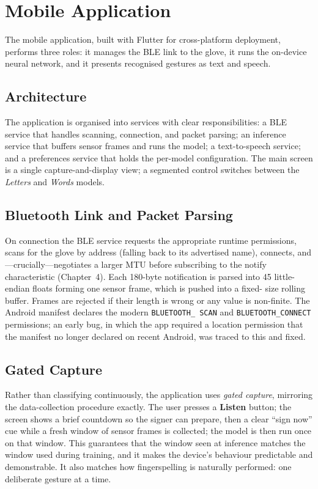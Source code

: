 \chapter{Mobile Application}

The mobile application, built with Flutter for cross-platform deployment,
performs three roles: it manages the BLE link to the glove, it runs the
on-device neural network, and it presents recognised gestures as text and
speech.

\section{Architecture}

The application is organised into services with clear responsibilities: a BLE
service that handles scanning, connection, and packet parsing; an inference
service that buffers sensor frames and runs the model; a text-to-speech
service; and a preferences service that holds the per-model configuration. The
main screen is a single capture-and-display view; a segmented control switches
between the \emph{Letters} and \emph{Words} models.

\section{Bluetooth Link and Packet Parsing}

On connection the BLE service requests the appropriate runtime permissions,
scans for the glove by address (falling back to its advertised name), connects,
and—crucially—negotiates a larger MTU before subscribing to the notify
characteristic (Chapter~4). Each 180-byte notification is parsed into 45
little-endian floats forming one sensor frame, which is pushed into a fixed-%
size rolling buffer. Frames are rejected if their length is wrong or any value
is non-finite. The Android manifest declares the modern \texttt{BLUETOOTH\_%
SCAN} and \texttt{BLUETOOTH\_CONNECT} permissions; an early bug, in which the
app required a location permission that the manifest no longer declared on
recent Android, was traced to this and fixed.

\section{Gated Capture}

Rather than classifying continuously, the application uses \emph{gated
capture}, mirroring the data-collection procedure exactly. The user presses a
\textbf{Listen} button; the screen shows a brief countdown so the signer can
prepare, then a clear ``sign now'' cue while a fresh window of sensor frames is
collected; the model is then run once on that window. This guarantees that the
window seen at inference matches the window used during training, and it makes
the device's behaviour predictable and demonstrable. It also matches how
fingerspelling is naturally performed: one deliberate gesture at a time.

